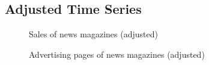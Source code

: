 \documentclass[12pt,a4paper,notitlepage]{article}
\begin{document}
\begin{appendices}
\subsection{Adjusted Time Series}

\begin{figure}[H]
		\caption{Sales of news magazines (adjusted)}
		\centering
		\label{fig_arima_sales_fss}
\end{figure}

\begin{figure}[H]
		\caption{Advertising pages of news magazines (adjusted)}
		\centering
		\label{fig_arima_ads_fss}
\end{figure}


\end{appendices}
\end{document}
